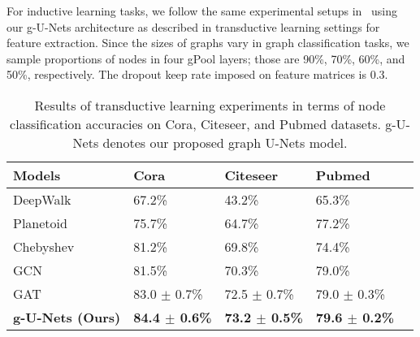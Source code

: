 \documentclass{article}
\begin{document}
For inductive learning tasks, we follow the same
experimental setups in~\cite{zhang2018end} using our g-U-Nets
architecture as described in transductive learning settings for feature
extraction. Since
the sizes of graphs vary in graph classification tasks, we sample
proportions of nodes in four gPool layers; those are 90\%, 70\%,
60\%, and 50\%, respectively. The dropout keep rate imposed on feature
matrices is 0.3.

\begin{table*}[t]
\centering \caption{Results of transductive learning experiments in
terms of node classification accuracies on Cora, Citeseer, and
Pubmed datasets. g-U-Nets denotes our proposed graph U-Nets model.}
\label{table:trans}
\begin{tabularx}{\textwidth}{  lx{3.5cm} YYY  }
    \hline
    \textbf{Models} & \textbf{Cora} & \textbf{Citeseer} & \textbf{Pubmed} \\ \hline\hline
    DeepWalk~\citep{perozzi2014deepwalk}            & 67.2\% & 43.2\%  & 65.3\%   \\ \hline
    Planetoid~\citep{yang2016revisiting}            & 75.7\% & 64.7\%  & 77.2\%   \\ \hline
    Chebyshev~\citep{defferrard2016convolutional}   & 81.2\% & 69.8\%  & 74.4\%   \\ \hline
    GCN~\citep{kipf2016semi}                        & 81.5\% & 70.3\%  & 79.0\%   \\ \hline
    GAT~\citep{velivckovic2017graph}                & 83.0 $\pm$ 0.7\% & 72.5 $\pm$ 0.7\% & 79.0 $\pm$ 0.3\% \\ \hline
\textbf{g-U-Nets (Ours)}                         & \textbf{84.4 $\pm$ 0.6\%}
                                                    & \textbf{73.2 $\pm$ 0.5\%}
                                                    & \textbf{79.6 $\pm$ 0.2\%} \\ \hline
    \hline
\end{tabularx}
\end{table*}
\end{document}
